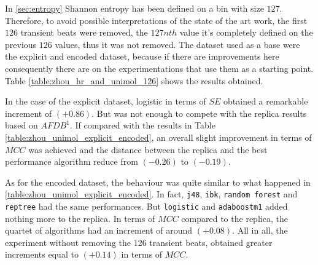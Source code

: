In \ref{sec:entropy} Shannon entropy has been defined on a bin with size $127$. Therefore, to avoid possible interpretations of the state of the art work, the first $126$ transient beats were removed, the $127nth$ value it's completely defined on the previous $126$ values, thus it was not removed. The dataset used as a base were the explicit and encoded dataset, because if there are improvements here consequently there are on the experimentations that use them as a starting point. Table \ref{table:zhou_hr_and_unimol_126} shows the results obtained.

In the case of the explicit dataset, logistic in terms of $SE$ obtained a remarkable increment of $(+0.86)$. But was not enough to compete with the replica results based on $AFDB^1$. If compared with the results in Table \ref{table:zhou_unimol_explicit_encoded}, an overall slight improvement in terms of $MCC$ was achieved and the distance between the replica and the best performance algorithm reduce from $(-0.26)$ to  $(-0.19)$.

As for the encoded dataset, the behaviour was quite similar to what happened in \ref{table:zhou_unimol_explicit_encoded}. In fact, \verb|j48|, \verb|ibk|, \verb|random forest| and \verb|reptree| had the same performances. But \verb|logistic| and \verb|adaboostm1| added nothing more to the replica. In terms of $MCC$ compared to the replica, the quartet of algorithms had an increment of around $(+0.08)$. All in all, the experiment without removing the 126 transient beats, obtained greater increments equal to $(+0.14)$ in terms of $MCC$.

